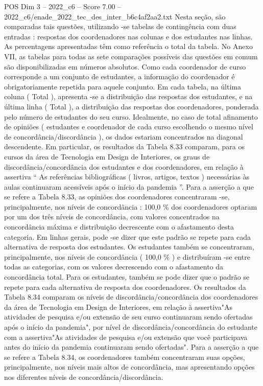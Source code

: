 \begin{textsample}{POS Dim 3 – 2022\_c6 – Score 7.00 – 2022\_c6/enade\_2022\_tec\_des\_inter\_b6c4af2aa2.txt}
Nesta seção, são comparadas tais questões, utilizando -se tabelas de contingência com duas entradas : respostas dos coordenadores nas colunas e dos estudantes nas linhas.
As percentagens apresentadas têm como referência o total da tabela.
No Anexo VII, as tabelas para todas as sete comparações possíveis das questões em comum são disponibilizadas em números absolutos.
Como cada coordenador de curso corresponde a um conjunto de estudantes, a informação do coordenador é obrigatoriamente repetida para aquele conjunto.
Em cada tabela, na última coluna ( Total ), apresenta -se a distribuição das respostas dos estudantes, e na última linha ( Total ), a distribuição das respostas dos coordenadores, ponderada pelo número de estudantes do seu curso.
Idealmente, no caso de total afinamento de opiniões ( estudantes e coordenador de cada curso escolhendo o mesmo nível de concordância/discordância ), os dados estariam concentrados na diagonal descendente.
Em particular, os resultados da Tabela 8.33 comparam, para os cursos da área de Tecnologia em Design de Interiores, os graus de discordância/concordância dos estudantes e dos coordenadores, em relação à assertiva “ As referências bibliográficas ( livros, artigos, textos ) necessárias às aulas continuaram acessíveis após o início da pandemia ”.
Para a asserção a que se refere a Tabela 8.33, as opiniões dos coordenadores concentraram -se, principalmente, nos níveis de concordância : 100,0 \% dos coordenadores optaram por um dos três níveis de concordância, com valores concentrados na concordância máxima e distribuição decrescente com o afastamento desta categoria.
Em linhas gerais, pode -se dizer que este padrão se repete para cada alternativa de resposta dos estudantes.
Os estudantes também se concentraram, principalmente, nos níveis de concordância ( 100,0 \% ) e distribuíram -se entre todas as categorias, com os valores decrescendo com o afastamento da concordância total.
Para os estudantes, também se pode dizer que o padrão se repete para cada alternativa de resposta dos coordenadores.
Os resultados da Tabela 8.34 comparam os níveis de discordância/concordância dos coordenadores da área de Tecnologia em Design de Interiores, em relação à assertiva"As atividades de pesquisa e/ou extensão de seu curso continuaram sendo ofertadas após o início da pandemia", por nível de discordância/concordância do estudante com a assertiva"As atividades de pesquisa e/ou extensão que você participava antes do início da pandemia continuaram sendo ofertadas".
Para a asserção a que se refere a Tabela 8.34, os coordenadores também concentraram suas opções, principalmente, nos níveis mais altos de concordância, mas apresentando opções nos diferentes níveis de concordância/discordância.

\end{textsample}
